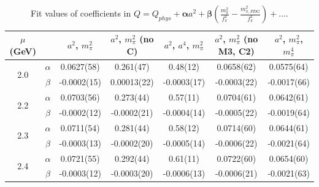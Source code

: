 \documentclass[12pt]{extarticle}
\begin{document}
\begin{table}[h!]
\begin{center}
\begin{tabular}{|c c|c|c|c|c|c|}
\hline
$\mu$ (GeV) &  & $a^2$, $m_\pi^2$& $a^2$, $m_\pi^2$ (no C)& $a^2$, $a^4$, $m_\pi^2$& $a^2$, $m_\pi^2$ (no M3, C2)& $a^2$, $m_\pi^2$, $m_\pi^4$\\
\hline
\multirow{2}{0.5in}{2.0} & $\alpha$ & 0.0627(58)& 0.261(47)& 0.48(12)& 0.0658(62)& 0.0575(64)\\
 & $\beta$ & -0.0002(15)& 0.00013(22)& -0.0003(17)& -0.0003(22)& -0.0017(66)\\
\hline
\multirow{2}{0.5in}{2.2} & $\alpha$ & 0.0703(56)& 0.273(44)& 0.57(11)& 0.0704(61)& 0.0642(61)\\
 & $\beta$ & -0.0002(12)& -0.0002(21)& -0.0004(14)& -0.0005(22)& -0.0019(64)\\
\hline
\multirow{2}{0.5in}{2.3} & $\alpha$ & 0.0711(54)& 0.281(44)& 0.58(12)& 0.0714(60)& 0.0644(61)\\
 & $\beta$ & -0.0003(13)& -0.0002(20)& -0.0005(14)& -0.0006(22)& -0.0021(64)\\
\hline
\multirow{2}{0.5in}{2.4} & $\alpha$ & 0.0721(55)& 0.292(44)& 0.61(11)& 0.0722(60)& 0.0654(60)\\
 & $\beta$ & -0.0003(12)& -0.0003(20)& -0.0006(13)& -0.0006(21)& -0.0021(63)\\
\hline
\end{tabular}
\caption{Fit values of coefficients in $Q = Q_{phys} + \mathbf{\alpha} a^2 + \mathbf{\beta}\left(\frac{m_\pi^2}{f_\pi^2}-\frac{m_{\pi,PDG}^2}{f_\pi^2}\right) + \ldots$.}
\end{center}
\end{table}




















\clearpage
\end{document}

